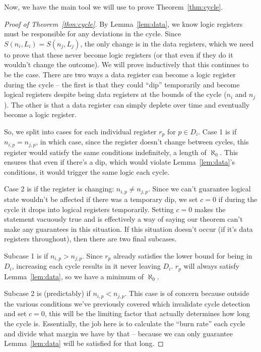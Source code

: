 \documentclass[12pt]{article}
\begin{document}
Now, we have the main tool we will use to prove Theorem~\ref{thm:cycle}.

\begin{proof}[Proof of Theorem~\ref{thm:cycle}]
By Lemma~\ref{lem:data}, we know logic registers must be responsible for any deviations in the cycle. Since $S(n_i, L_i) = S(n_j, L_j)$, the only change is in the data registers, which we need to prove that these never become logic registers (or that even if they do it wouldn't change the outcome). We will prove inductively that this continues to be the case. There are two ways a data register can become a logic register during the cycle -- the first is that they could ``dip'' temporarily and become logical registers despite being data registers at the bounds of the cycle ($n_i$ and $n_j$). The other is that a data register can simply deplete over time and eventually become a logic register.

So, we split into cases for each individual register $r_p$ for $p \in D_i$. Case 1 is if $n_{i,p} = n_{j,p}$, in which case, since the register doesn't change between cycles, this register would satisfy the same conditions indefinitely, a length of $\aleph_0$. This ensures that even if there's a dip, which would violate Lemma~\ref{lem:data}'s conditions, it would trigger the same logic each cycle.

Case 2 is if the register is changing: $n_{i,p} \neq n_{j,p}$. Since we can't guarantee logical state wouldn't be affected if there was a temporary dip, we set $c = 0$ if during the cycle it drops into logical registers temporarily. Setting $c = 0$ makes the statement vacuously true and is effectively a way of saying our theorem can't make any guarantees in this situation. If this situation doesn't occur (if it's data registers throughout), then there are two final subcases.

Subcase 1 is if $n_{i,p} > n_{j,p}$. Since $r_p$ already satisfies the lower bound for being in $D_i$, increasing each cycle results in it never leaving $D_i$. $r_p$ will always satisfy Lemma~\ref{lem:data}, so we have a minimum of $\aleph_0$.

Subcase 2 is (predictably) if $n_{i,p} < n_{j,p}$. This case is of concern because outside the various conditions we've previously covered which invalidate cycle detection and set $c = 0$, this will be the limiting factor that actually determines how long the cycle is. Essentially, the job here is to calculate the ``burn rate'' each cycle and divide what margin we have by that -- because we can only guarantee Lemma~\ref{lem:data} will be satisfied for that long.


\end{proof}
\end{document}
